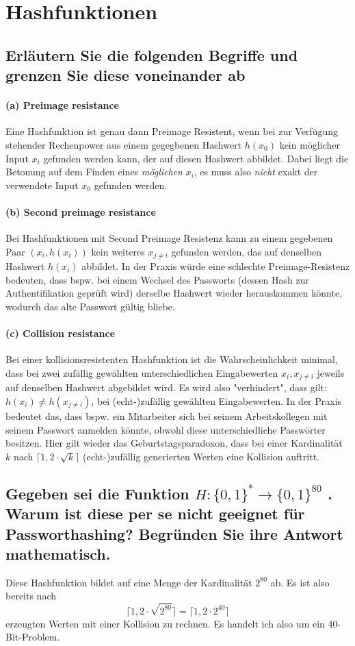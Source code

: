 
\section{Hashfunktionen}

\subsection{Erläutern Sie die folgenden Begriffe und grenzen Sie diese voneinander ab}
\paragraph{(a) Preimage resistance} Eine Hashfunktion ist genau dann Preimage Resistent, wenn bei zur Verfügung stehender Rechenpower aus einem gegegbenen Hashwert $h(x_0)$ kein möglicher Input $x_i$ gefunden werden kann, der auf diesen Hashwert abbildet. Dabei liegt die Betonung auf dem Finden eines \textit{möglichen} $x_i$, es muss also \textit{nicht} exakt der verwendete Input $x_0$ gefunden werden. 
\paragraph{(b) Second preimage resistance} Bei Hashfunktionen mit Second Preimage Resistenz kann zu einem gegebenen Paar $(x_i, h(x_i))$ kein weiteres $x_{j \neq i}$ gefunden werden, das auf denselben Hashwert $h(x_i)$ abbildet. In der Praxis würde eine schlechte Preimage-Resistenz bedeuten, dass bspw. bei einem Wechsel des Passworts (dessen Hash zur Authentifikation geprüft wird) derselbe Hashwert wieder herauskommen könnte, wodurch das alte Passwort gültig bliebe.
\paragraph{(c) Collision resistance} Bei einer kollisionsresistenten Hashfunktion ist die Wahrscheinlichkeit minimal, dass bei zwei zufällig gewählten unterschiedlichen Eingabewerten $x_i, x_{j \neq i}$ jeweils auf denselben Hashwert abgebildet wird. Es wird also "verhindert", dass gilt: $h(x_i) \neq h(x_{j \neq i})$, bei (echt-)zufällig gewählten Eingabewerten. In der Praxis bedeutet das, dass bspw. ein Mitarbeiter sich bei seinem Arbeitskollegen mit seinem Passwort anmelden könnte, obwohl diese unterschiedliche Passwörter besitzen. Hier gilt wieder das Geburtstagsparadoxon, dass bei einer Kardinalität $k$ nach $\lceil 1,2 \cdot \sqrt{k} \rceil$ (echt-)zufällig generierten Werten eine Kollision auftritt.

\subsection{Gegeben sei die Funktion $H : \{0, 1\}^\ast \rightarrow \{0, 1\}^{80}$ . Warum ist diese per se nicht geeignet für Passworthashing? Begründen Sie ihre Antwort mathematisch.}
Diese Hashfunktion bildet auf eine Menge der Kardinalität $2^{80}$ ab. Es ist also bereits nach
$$
\lceil 1,2 \cdot \sqrt{2^{80}} \rceil = \lceil 1,2 \cdot 2^{40} \rceil 
$$
erzeugten Werten mit einer Kollision zu rechnen. Es handelt ich also um ein 40-Bit-Problem.

